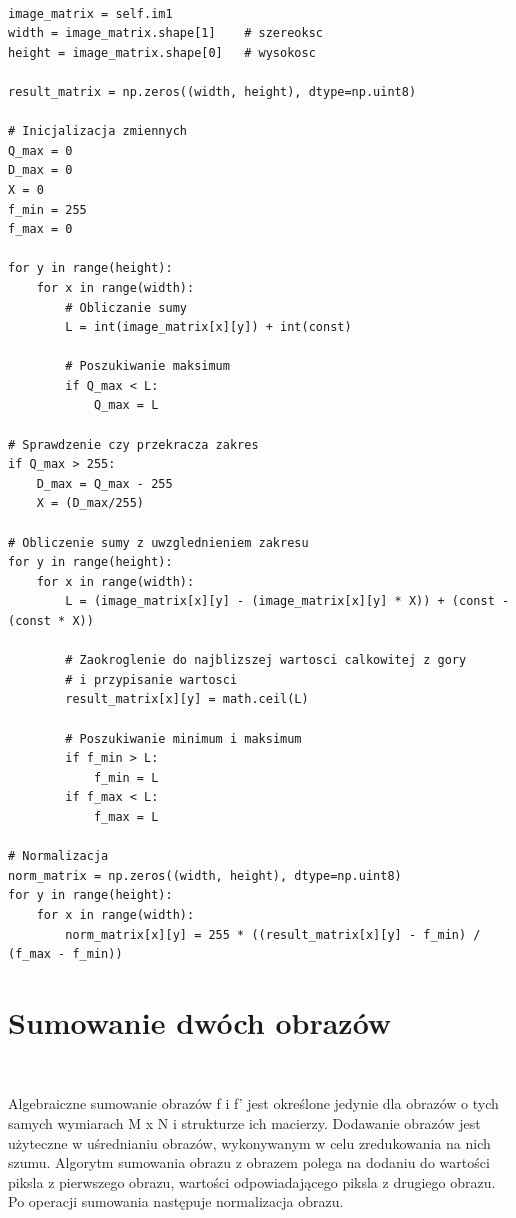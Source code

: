 \documentclass[final,a4paper,openany,12pt]{mwbk}
\begin{document}
\begin{lstlisting}[caption=Sumowanie obrazu szarego ze stałą]

image_matrix = self.im1
width = image_matrix.shape[1]    # szereoksc
height = image_matrix.shape[0]   # wysokosc

result_matrix = np.zeros((width, height), dtype=np.uint8)

# Inicjalizacja zmiennych
Q_max = 0
D_max = 0
X = 0
f_min = 255
f_max = 0

for y in range(height):
    for x in range(width):  
        # Obliczanie sumy
        L = int(image_matrix[x][y]) + int(const)

        # Poszukiwanie maksimum
        if Q_max < L:
            Q_max = L

# Sprawdzenie czy przekracza zakres
if Q_max > 255:
    D_max = Q_max - 255
    X = (D_max/255)

# Obliczenie sumy z uwzglednieniem zakresu
for y in range(height):
    for x in range(width): 
        L = (image_matrix[x][y] - (image_matrix[x][y] * X)) + (const - (const * X))

        # Zaokroglenie do najblizszej wartosci calkowitej z gory
        # i przypisanie wartosci
        result_matrix[x][y] = math.ceil(L)

        # Poszukiwanie minimum i maksimum
        if f_min > L:
            f_min = L
        if f_max < L:
            f_max = L

# Normalizacja
norm_matrix = np.zeros((width, height), dtype=np.uint8)
for y in range(height):
    for x in range(width):
        norm_matrix[x][y] = 255 * ((result_matrix[x][y] - f_min) / (f_max - f_min))

\end{lstlisting}



\section {Sumowanie dwóch obrazów}
\hfill\\
\indent

Algebraiczne sumowanie obrazów f i f' jest określone jedynie dla obrazów o tych samych wymiarach M x N i strukturze ich macierzy.
Dodawanie obrazów jest użyteczne w uśrednianiu obrazów, wykonywanym w celu zredukowania na nich szumu.
Algorytm sumowania obrazu z obrazem polega na dodaniu do wartości piksla z pierwszego obrazu, wartości odpowiadającego piksla z drugiego obrazu.
Po operacji sumowania następuje normalizacja obrazu.
\end{document}
